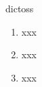 \begin{prework}{ dictoss }
  \begin{enumerate}
  \item xxx
  \item xxx
  \item xxx
  \end{enumerate}
\end{prework}
